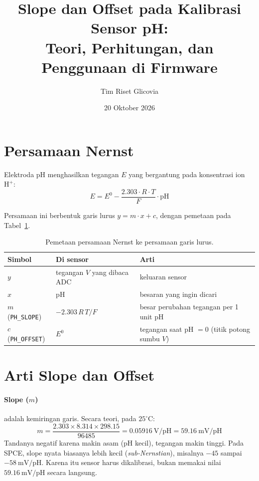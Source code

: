\documentclass[12pt,a4paper]{article}
\title{\textbf{Slope dan Offset pada Kalibrasi Sensor pH:\\Teori, Perhitungan, dan Penggunaan di Firmware}}
\author{Tim Riset Glicovia}
\date{20 Oktober 2026}
\begin{document}
\maketitle

\section{Persamaan Nernst}

Elektroda pH menghasilkan tegangan $E$ yang bergantung pada konsentrasi ion $\text{H}^+$:
\begin{equation}
E = E^0 - \frac{2.303 \cdot R \cdot T}{F} \cdot \text{pH}
\end{equation}

Persamaan ini berbentuk garis lurus $y = m \cdot x + c$, dengan pemetaan pada Tabel~\ref{tab:simbol}.

\begin{table}[h]
\centering
\begin{tabular}{@{}llp{6.5cm}@{}}
\toprule
Simbol & Di sensor & Arti \\
\midrule
$y$ & tegangan $V$ yang dibaca ADC & keluaran sensor \\
$x$ & pH & besaran yang ingin dicari \\
$m$ (\texttt{PH\_SLOPE}) & $-2.303\,R\,T/F$ & besar perubahan tegangan per 1 unit pH \\
$c$ (\texttt{PH\_OFFSET}) & $E^0$ & tegangan saat pH $= 0$ (titik potong sumbu $V$) \\
\bottomrule
\end{tabular}
\caption{Pemetaan persamaan Nernst ke persamaan garis lurus.}
\label{tab:simbol}
\end{table}

\section{Arti Slope dan Offset}

\paragraph{Slope ($m$)} adalah kemiringan garis. Secara teori, pada $25^\circ\text{C}$:
\begin{equation}
m = \frac{2.303 \times 8.314 \times 298.15}{96485} = 0.05916\ \text{V/pH} = 59.16\ \text{mV/pH}
\end{equation}
Tandanya negatif karena makin asam (pH kecil), tegangan makin tinggi. Pada SPCE, slope nyata biasanya lebih kecil (\textit{sub-Nernstian}), misalnya $-45$ sampai $-58\ \text{mV/pH}$. Karena itu sensor harus dikalibrasi, bukan memakai nilai $59.16\ \text{mV/pH}$ secara langsung.
\end{document}
